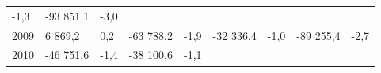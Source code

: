 \begin{longtable}[]{@{}lllllllll@{}}
\begin{minipage}[t]{0.06\columnwidth}
-1,3\strut
\end{minipage} & \begin{minipage}[t]{0.09\columnwidth}\raggedright
-93 851,1\strut
\end{minipage} & \begin{minipage}[t]{0.06\columnwidth}\raggedright
-3,0\strut
\end{minipage}\tabularnewline
\begin{minipage}[t]{0.05\columnwidth}\raggedright
2009\strut
\end{minipage} & \begin{minipage}[t]{0.10\columnwidth}\raggedright
6 869,2\strut
\end{minipage} & \begin{minipage}[t]{0.06\columnwidth}\raggedright
0,2\strut
\end{minipage} & \begin{minipage}[t]{0.16\columnwidth}\raggedright
-63 788,2\strut
\end{minipage} & \begin{minipage}[t]{0.06\columnwidth}\raggedright
-1,9\strut
\end{minipage} & \begin{minipage}[t]{0.12\columnwidth}\raggedright
-32 336,4\strut
\end{minipage} & \begin{minipage}[t]{0.06\columnwidth}\raggedright
-1,0\strut
\end{minipage} & \begin{minipage}[t]{0.09\columnwidth}\raggedright
-89 255,4\strut
\end{minipage} & \begin{minipage}[t]{0.06\columnwidth}\raggedright
-2,7\strut
\end{minipage}\tabularnewline
\begin{minipage}[t]{0.05\columnwidth}\raggedright
2010\strut
\end{minipage} & \begin{minipage}[t]{0.10\columnwidth}\raggedright
-46 751,6\strut
\end{minipage} & \begin{minipage}[t]{0.06\columnwidth}\raggedright
-1,4\strut
\end{minipage} & \begin{minipage}[t]{0.16\columnwidth}\raggedright
-38 100,6\strut
\end{minipage} & \begin{minipage}[t]{0.06\columnwidth}\raggedright
-1,1\strut
\end{minipage} & \begin{minipage}[t]{0.12\columnwidth}\raggedright

\end{minipage}
\end{longtable}
